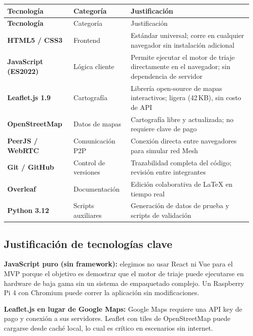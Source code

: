 \documentclass[12pt,a4paper]{article}
\begin{document}
\begin{longtable}{>{\bfseries}p{3cm} p{4cm} p{6cm}}
  \toprule
  Tecnología & Categoría & Justificación \\
  \midrule
  \endfirsthead
  \toprule
  Tecnología & Categoría & Justificación \\
  \midrule
  \endhead
  HTML5 / CSS3 & Frontend & Estándar universal; corre en cualquier navegador
                            sin instalación adicional \\[4pt]
  JavaScript (ES2022) & Lógica cliente & Permite ejecutar el motor de triaje
                                          directamente en el navegador;
                                          sin dependencia de servidor \\[4pt]
  Leaflet.js 1.9 & Cartografía & Librería open-source de mapas interactivos;
                                  ligera (42\,KB), sin costo de API \\[4pt]
  OpenStreetMap & Datos de mapas & Cartografía libre y actualizada; no
                                    requiere clave de pago \\[4pt]
  PeerJS / WebRTC & Comunicación P2P & Conexión directa entre navegadores
                                        para simular red Mesh \\[4pt]
  Git / GitHub & Control de versiones & Trazabilidad completa del código;
                                         revisión entre integrantes \\[4pt]
  Overleaf & Documentación & Edición colaborativa de \LaTeX{} en tiempo real \\[4pt]
  Python 3.12 & Scripts auxiliares & Generación de datos de prueba y
                                      scripts de validación \\
  \bottomrule
\end{longtable}

\subsection{Justificación de tecnologías clave}

\textbf{JavaScript puro (sin framework):} elegimos no usar React ni Vue para
el MVP porque el objetivo es demostrar que el motor de triaje puede ejecutarse
en hardware de baja gama sin un sistema de empaquetado complejo. Un Raspberry
Pi 4 con Chromium puede correr la aplicación sin modificaciones.

\textbf{Leaflet.js en lugar de Google Maps:} Google Maps requiere una API key
de pago y conexión a sus servidores. Leaflet con tiles de OpenStreetMap puede
cargarse desde caché local, lo cual es crítico en escenarios sin internet.
\end{document}
